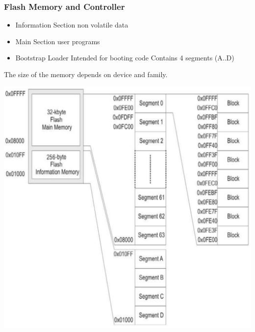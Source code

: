 \subsubsection{Flash Memory and Controller }
\begin{minipage}{0.5\linewidth}
    \begin{itemize}
        \item Information Section
        \subitem non volatile data 
        \item Main Section
        \subitem  user programs
        \item Bootstrap Loader
        \subitem Intended for booting code 
        \subitem Contains 4 segments (A..D)
    \end{itemize}
The size of the memory depends on device and family.
\end{minipage}
\begin{minipage}{0.5\linewidth}
    \includegraphics[width=0.7\linewidth]{images/FlashOrganization}
\end{minipage}

